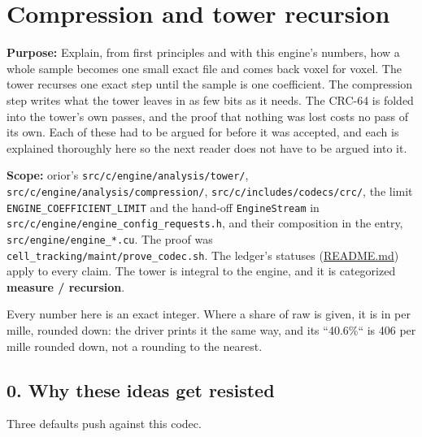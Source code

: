 \chapter{\texorpdfstring{Compression and tower recursion}{Compression and tower recursion}}
\label{chap:compression-tower}

\textbf{Purpose:} Explain, from first principles and with this engine's numbers, how a whole sample becomes one small exact file and comes back voxel for voxel. The tower recurses one exact step until the sample is one coefficient. The compression step writes what the tower leaves in as few bits as it needs. The CRC-64 is folded into the tower's own passes, and the proof that nothing was lost costs no pass of its own. Each of these had to be argued for before it was accepted, and each is explained thoroughly here so the next reader does not have to be argued into it.

\textbf{Scope:} orior's \texttt{src/\allowbreak{}c/\allowbreak{}engine/\allowbreak{}analysis/\allowbreak{}tower/\allowbreak{}}, \texttt{src/\allowbreak{}c/\allowbreak{}engine/\allowbreak{}analysis/\allowbreak{}compression/\allowbreak{}}, \texttt{src/\allowbreak{}c/\allowbreak{}includes/\allowbreak{}codecs/\allowbreak{}crc/\allowbreak{}}, the limit \texttt{ENGINE\_\allowbreak{}COEFFICIENT\_\allowbreak{}LIMIT} and the hand-off \texttt{Engine\allowbreak{}Stream} in \texttt{src/\allowbreak{}c/\allowbreak{}engine/\allowbreak{}engine\_\allowbreak{}config\_\allowbreak{}requests.\allowbreak{}h}, and their composition in the entry, \texttt{src/\allowbreak{}engine/\allowbreak{}engine\_\allowbreak{}*.\allowbreak{}cu}. The proof was \texttt{cell\_\allowbreak{}tracking/\allowbreak{}maint/\allowbreak{}prove\_\allowbreak{}codec.\allowbreak{}sh}. The ledger's statuses (\hyperref[chap:readme]{README.md}) apply to every claim. The tower is integral to the engine, and it is categorized \textbf{measure / recursion}.

Every number here is an exact integer. Where a share of raw is given, it is in per mille, rounded down: the driver prints it the same way, and its “40.6\%“ is 406 per mille rounded down, not a rounding to the nearest.

\section{\texorpdfstring{0. Why these ideas get resisted}{0. Why these ideas get resisted}}

Three defaults push against this codec.

